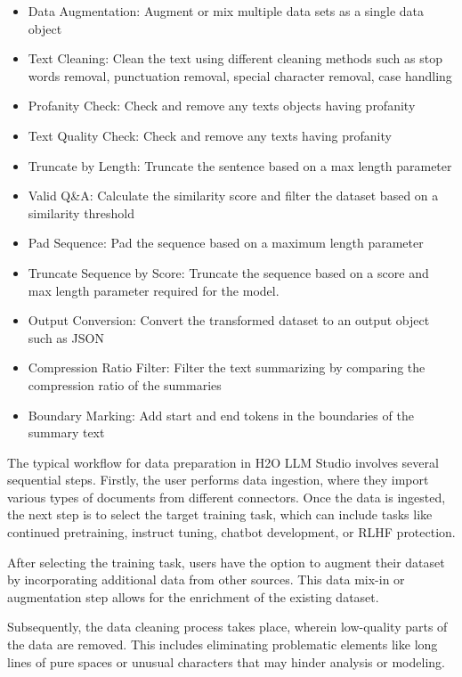 \documentclass{article}
\begin{document}
\begin{itemize}
    \item Data Augmentation: Augment or mix multiple data sets as a single data object
    \item Text Cleaning: Clean the text using different cleaning methods such as stop words removal, punctuation removal, special character removal, case handling
    \item Profanity Check: Check and remove any texts objects having profanity
    \item Text Quality Check: Check and remove any texts having profanity
    \item Truncate by Length: Truncate the sentence based on a max length parameter
    \item Valid Q\&A: Calculate the similarity score and filter the dataset based on a similarity threshold
    \item Pad Sequence: Pad the sequence based on a maximum length parameter
    \item Truncate Sequence by Score: Truncate the sequence based on a score and max length parameter required for the model.
    \item Output Conversion: Convert the transformed dataset to an output object such as JSON
    \item Compression Ratio Filter: Filter the text summarizing by comparing the compression ratio of the summaries
    \item Boundary Marking: Add start and end tokens in the boundaries of the summary text
\end{itemize}

The typical workflow for data preparation in H2O LLM Studio involves several sequential steps. Firstly, the user performs data ingestion, where they import various types of documents from different connectors. Once the data is ingested, the next step is to select the target training task, which can include tasks like continued pretraining, instruct tuning, chatbot development, or RLHF protection.

After selecting the training task, users have the option to augment their dataset by incorporating additional data from other sources. This data mix-in or augmentation step allows for the enrichment of the existing dataset. 

Subsequently, the data cleaning process takes place, wherein low-quality parts of the data are removed. This includes eliminating problematic elements like long lines of pure spaces or unusual characters that may hinder analysis or modeling.
\end{document}
